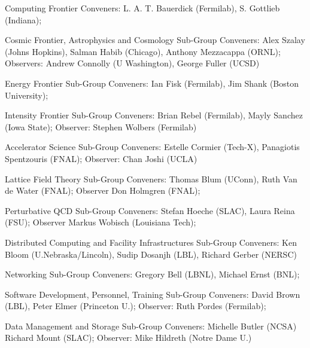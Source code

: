 

\begin{center}

\begin{large} {Computing Frontier Conveners: L. A. T. Bauerdick (Fermilab), S. Gottlieb (Indiana);

Cosmic Frontier, Astrophysics and Cosmology Sub-Group Conveners:
Alex Szalay (Johns Hopkins), Salman Habib (Chicago), Anthony Mezzacappa (ORNL); 
Observers: Andrew Connolly (U Washington), George Fuller (UCSD)

Energy Frontier Sub-Group Conveners: 
Ian Fisk (Fermilab), Jim Shank (Boston University);

Intensity Frontier Sub-Group Conveners: 
Brian Rebel (Fermilab), Mayly Sanchez (Iowa State);
Observer: Stephen Wolbers (Fermilab)

Accelerator Science Sub-Group Conveners: 
Estelle Cormier (Tech-X), Panagiotis Spentzouris (FNAL); 
Observer: Chan Joshi (UCLA)

Lattice Field Theory Sub-Group Conveners: 
Thomas Blum (UConn), Ruth Van de Water (FNAL); 
Observer Don Holmgren (FNAL);

Perturbative QCD Sub-Group Conveners: 
Stefan Hoeche (SLAC), Laura Reina (FSU); 
Observer Markus Wobisch (Louisiana Tech);

Distributed Computing and Facility Infrastructures Sub-Group Conveners: 
Ken Bloom (U.Nebraska/Lincoln), Sudip Dosanjh (LBL), Richard Gerber (NERSC)

Networking Sub-Group Conveners: 
Gregory Bell (LBNL), Michael Ernst (BNL);

Software Development, Personnel, Training Sub-Group Conveners: 
David Brown (LBL), Peter Elmer (Princeton U.);
Observer: Ruth Pordes (Fermilab);

Data Management and Storage Sub-Group Conveners: 
Michelle Butler (NCSA) Richard Mount (SLAC); 
Observer: Mike Hildreth (Notre Dame U.)

} \end{large}

 

\end{center}

